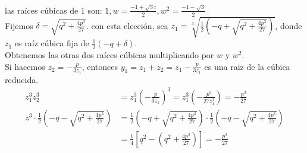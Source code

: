 \documentclass{article}
\begin{document}
las raíces cúbicas de 1 son: $1,w=\frac{-1+\sqrt{3}i}{2},w^2=\frac{-1-\sqrt{3}}{2}$\\
Fijemos $\delta=\sqrt{q^2+\frac{4p^3}{27}}$. con esta elección, sea $z_1=\sqrt[3]{\frac{1}{2}\left(-q+\sqrt{q^2+\frac{4p^3}{27}}\right)}$, donde $z_1$ es raíz cúbica fija de $\frac{1}{2}(-q+\delta)$.\\
Obtenemos las otras dos raíces cúbicas multiplicando por $w$ y $w^2$.\\
Si hacemos $z_2=-\frac{p}{3z_1}$, entonces $y_1=z_1+z_2=z_1-\frac{p}{3z_1}$ es una raiz de la cúbica reducida.
\begin{align*}
    z_1^3z_2^3&=z_1^3\left(-\frac{p}{3z_1}\right)^3=z_1^3\left(-\frac{p^3}{27z_1^3}\right)=-\frac{p^3}{27}\\
    z^3\cdot \frac{1}{2}\left(-q-\sqrt{q^2+\frac{4p^3}{27}}\right)&=\frac{1}{2}\left(-q+\sqrt{q^2+\frac{4p^3}{27}}\right)\cdot \frac{1}{2}\left(-q-\sqrt{q^2+\frac{4p^3}{27}}\right)\\&=\frac{1}{4}\left[q^2-\left(q^2+\frac{4p^3}{27}\right)\right]=-\frac{p^3}{27}\\
\end{align*}
\end{document}
